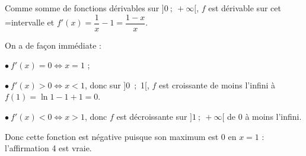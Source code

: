 \documentclass[10pt]{article}
\begin{document}
\begin{enumerate}
Comme somme de fonctions dérivables sur $]0~;~+ \infty[$, $f$ est dérivable sur cet =intervalle et $f'(x) = \dfrac 1x - 1 = \dfrac{1 - x}{x}$.

On a de façon immédiate :

$\bullet~$$f'(x) = 0 \iff x = 1$ ;

$\bullet~$$f'(x) > 0 \iff x < 1$, donc sur ]0~;~1[, \: $f$ est croissante de moins l'infini à $f(1) = \ln 1 - 1 + 1 = 0$.

$\bullet~f'(x) < 0 \iff x > 1$, donc $f$ est décroissante sur $]1~;~+ \infty[$ de 0 à moins l'infini.

Donc cette fonction est négative puisque son maximum est 0 en $x = 1$ : l'affirmation 4 est vraie.
\end{enumerate}

\medskip
\end{document}
